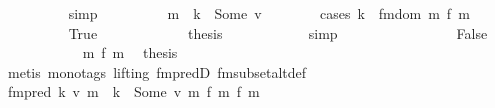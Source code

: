 \begin{isabellebody}
\ \ \ \ \ \ \ \ \isamarkupfalse%
\ simp\isanewline
\ \ \ \ \ \ \isamarkupfalse%
\ \isamarkupfalse%
\ {\isachardoublequoteopen}m\ {\isachardollar}{\kern0pt}{\isachardollar}{\kern0pt}\ k\ {\isacharequal}{\kern0pt}\ Some\ v{\isachardoublequoteclose}\isanewline
\ \ \ \ \ \ \isamarkupfalse%
\ {\isacharparenleft}{\kern0pt}cases\ {\isachardoublequoteopen}k\ {\isacharbar}{\kern0pt}{\isasymin}{\isacharbar}{\kern0pt}\ fmdom\ {\isacharparenleft}{\kern0pt}m\ {\isacharminus}{\kern0pt}{\isacharminus}{\kern0pt}\isactrlsub f\ m\isanewline
\ \ \ \ \ \ \ \ \isamarkupfalse%
\ True\isanewline
\ \ \ \ \ \ \ \ \isamarkupfalse%
\ {\isacharasterisk}{\kern0pt}{\isacharasterisk}{\kern0pt}\ \isamarkupfalse%
\ {\isacharquery}{\kern0pt}thesis\isanewline
\ \ \ \ \ \ \ \ \ \ \isamarkupfalse%
\ simp\isanewline
\ \ \ \ \ \ \isamarkupfalse%
\isanewline
\ \ \ \ \ \ \ \ \isamarkupfalse%
\ False\isanewline
\ \ \ \ \ \ \ \ \isamarkupfalse%
\ {\isacharasterisk}{\kern0pt}{\isacharasterisk}{\kern0pt}\ \ {\isacartoucheopen}m\ {\isasymsubseteq}\isactrlsub f\ m\ \isamarkupfalse%
\ {\isacharquery}{\kern0pt}thesis\isanewline
\ \ \ \ \ \ \ \ \ \ \isamarkupfalse%
\ {\isacharparenleft}{\kern0pt}metis\ {\isacharparenleft}{\kern0pt}mono{\isacharunderscore}{\kern0pt}tags{\isacharcomma}{\kern0pt}\ lifting{\isacharparenright}{\kern0pt}\ fmpredD\ fmsubset{\isacharunderscore}{\kern0pt}alt{\isacharunderscore}{\kern0pt}def{\isacharparenright}{\kern0pt}\isanewline
\ \ \ \ \ \ \isamarkupfalse%
\isanewline
\ \ \ \ \isamarkupfalse%
\isanewline
\ \ \ \ \isamarkupfalse%
\ \isamarkupfalse%
\ {\isachardoublequoteopen}fmpred\ {\isacharparenleft}{\kern0pt}{\isasymlambda}k\ v{\isachardot}{\kern0pt}\ m\ {\isachardollar}{\kern0pt}{\isachardollar}{\kern0pt}\ k\ {\isacharequal}{\kern0pt}\ Some\ v{\isacharparenright}{\kern0pt}\ {\isacharparenleft}{\kern0pt}m\ {\isacharplus}{\kern0pt}{\isacharplus}{\kern0pt}\isactrlsub f\ {\isacharparenleft}{\kern0pt}m\ {\isacharminus}{\kern0pt}{\isacharminus}{\kern0pt}\isactrlsub f\ m\isanewline

\end{isabellebody}
